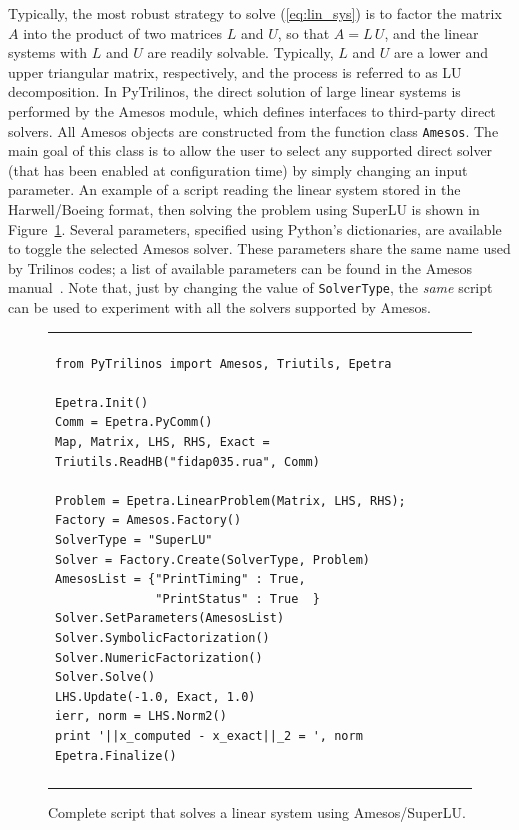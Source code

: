 \documentclass[acmtocl]{acmtrans2m}
\begin{document}
\smallskip

Typically, the most robust strategy to solve (\ref{eq:lin_sys}) is to
factor the matrix $A$ into the product of two matrices $L$ and $U$, so
that $A = L \, U$, and the linear systems with $L$ and $U$ are readily
solvable. Typically, $L$ and $U$ are a lower and upper triangular
matrix, respectively, and the process is referred to as LU
decomposition. In PyTrilinos, the direct solution of large linear
systems is performed by the Amesos module, which defines interfaces to
third-party direct solvers. All Amesos objects are constructed from
the function class {\tt Amesos}.  The main goal of this class is to
allow the user to select any supported direct solver (that has been
enabled at configuration time) by simply changing an input
parameter. An example of a script reading the linear system stored in
the Harwell/Boeing format, then solving the problem using SuperLU is
shown in Figure~\ref{fig:amesos}.  Several parameters, specified using
Python's dictionaries, are available to toggle the selected Amesos
solver. These parameters share the same name used by Trilinos codes; a
list of available parameters can be found in the Amesos
manual~\cite{Amesos-Reference-Guide}. Note that, just by changing the
value of \verb!SolverType!, the {\sl same} script can be used to
experiment with all the solvers supported by Amesos.

\begin{figure}
  \begin{center}
    \begin{tabular}{| p{12cm} |}
      \hline \\
      \footnotesize
      \begin{minipage}{11.5cm}
\begin{verbatim}
from PyTrilinos import Amesos, Triutils, Epetra

Epetra.Init()
Comm = Epetra.PyComm()
Map, Matrix, LHS, RHS, Exact = Triutils.ReadHB("fidap035.rua", Comm)

Problem = Epetra.LinearProblem(Matrix, LHS, RHS);
Factory = Amesos.Factory()
SolverType = "SuperLU"
Solver = Factory.Create(SolverType, Problem)
AmesosList = {"PrintTiming" : True,
              "PrintStatus" : True  }
Solver.SetParameters(AmesosList)
Solver.SymbolicFactorization()
Solver.NumericFactorization()
Solver.Solve()
LHS.Update(-1.0, Exact, 1.0)
ierr, norm = LHS.Norm2()
print '||x_computed - x_exact||_2 = ', norm
Epetra.Finalize()
\end{verbatim}
      \end{minipage}
      \\
      \\
      \hline
    \end{tabular}
    \caption{Complete script that solves a linear system using
      Amesos/SuperLU.}
    \label{fig:amesos}
  \end{center}
\end{figure}
\end{document}
